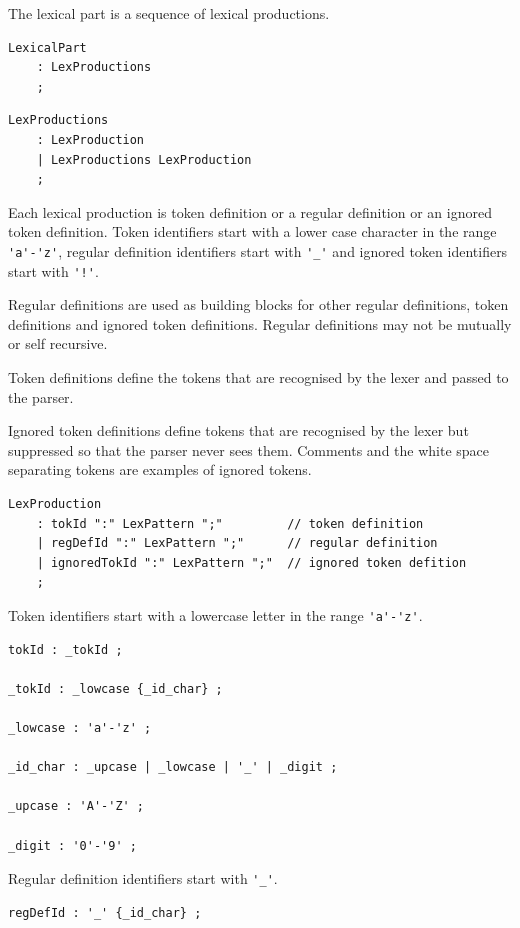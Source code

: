 \documentclass[12pt]{article}
\begin{document}
The lexical part is a sequence of lexical productions.

\begin{Verbatim}[frame=single]
LexicalPart
    : LexProductions
    ;
\end{Verbatim}

\begin{Verbatim}[frame=single]
LexProductions
    : LexProduction
    | LexProductions LexProduction
    ;
\end{Verbatim}

Each lexical production is token definition or a regular definition or an ignored token definition. Token identifiers start with a lower case character in the range \verb|'a'-'z'|, regular definition identifiers start with \verb|'_'| and ignored token identifiers start with \verb|'!'|.

Regular definitions are used as building blocks for other regular definitions, token definitions and ignored token definitions. Regular definitions may not be mutually or self recursive.

Token definitions define the tokens that are recognised by the lexer and passed to the parser.

Ignored token definitions define tokens that are recognised by the lexer but suppressed so that the parser never sees them. Comments and the white space separating tokens are examples of ignored tokens.

\begin{Verbatim}[frame=single]
LexProduction
    : tokId ":" LexPattern ";"         // token definition
    | regDefId ":" LexPattern ";"      // regular definition
    | ignoredTokId ":" LexPattern ";"  // ignored token defition
    ;
\end{Verbatim}

Token identifiers start with a lowercase letter in the range \verb|'a'-'z'|.

\begin{Verbatim}[frame=single]
tokId : _tokId ;

_tokId : _lowcase {_id_char} ;

_lowcase : 'a'-'z' ;

_id_char : _upcase | _lowcase | '_' | _digit ;

_upcase : 'A'-'Z' ;

_digit : '0'-'9' ;
\end{Verbatim}

Regular definition identifiers start with \verb|'_'|.

\begin{Verbatim}[frame=single]
regDefId : '_' {_id_char} ;
\end{Verbatim}
\end{document}
